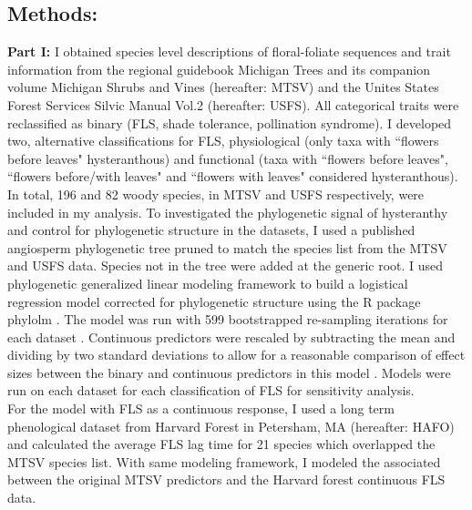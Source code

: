 \documentclass{article}\usepackage[]{graphicx}\usepackage[]{color}
\begin{document}
\subsection*{Methods:}
\indent\indent\textbf{Part I:} I obtained species level descriptions of floral-foliate sequences and trait information from the regional guidebook Michigan Trees \citep{Barnes2004} and its companion volume Michigan Shrubs and Vines \citep{Barnes2016} (hereafter: MTSV) and the Unites States Forest Services Silvic Manual Vol.2 \citep{Burns1990} (hereafter: USFS). All categorical traits were reclassified as binary (FLS, shade tolerance, pollination syndrome). I developed two, alternative classifications for FLS, physiological (only taxa with ``flowers before leaves" hysteranthous) and functional (taxa with ``flowers before leaves", ``flowers before/with leaves" and ``flowers with leaves" considered hysteranthous). In total, 196 and 82 woody species, in MTSV and USFS respectively, were included in my analysis. To investigated the phylogenetic signal of hysteranthy and control for phylogenetic structure in the datasets, I used a published angiosperm phylogenetic tree \citep{Zanne2013} pruned to match the species list from the MTSV and USFS data. Species not in the tree were added at the generic root. I used phylogenetic generalized linear modeling framework \citep{Ives2010} to build a logistical regression model corrected for phylogenetic structure using the R package phylolm \citep{Ho2014}. The model was run with 599 bootstrapped re-sampling iterations for each dataset \citep{Wilcox2010}. Continuous predictors were rescaled by subtracting the mean and dividing by two standard deviations to allow for a reasonable comparison of effect sizes between the binary and continuous predictors in this model \citep{Gelman2007}. Models were run on each dataset for each classification of FLS for sensitivity analysis.\\ 
\indent For the model with FLS as a continuous response, I used a long term phenological dataset from Harvard Forest in Petersham, MA \citep{Okeefe2015} (hereafter: HAFO)  and calculated the average FLS lag time for 21 species which overlapped the MTSV species list. With same modeling framework, I modeled the associated between the original MTSV predictors and the Harvard forest continuous FLS data.\\
\end{document}
